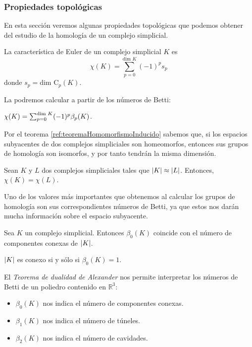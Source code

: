 \subsubsection*{Propiedades topológicas}
En esta sección veremos algunas propiedades topológicas que podemos obtener del estudio de la homología de un complejo simplicial.

\begin{definition}
La característica de Euler de un complejo simplicial $K$ es 
\[
\chi(K) = \sum_{p=0}^{\text{dim } K} (-1)^p s_p
\]
donde $s_p = \text{dim } \text{C}_p(K)$.
\end{definition}
La podremos calcular a partir de los números de Betti:
\begin{theorem}
$\chi(K) = \sum_{p=0}^{\text{\rm dim } K} (-1)^p \beta_p(K)$.
\end{theorem}

Por el teorema \ref{ref:teoremaHomomorfismoInducido} sabemos que, si los espacios subyacentes de dos complejos simpliciales son homeomorfos, entonces sus grupos de homología son isomorfos, y por tanto tendrán la misma dimensión.
\begin{corollary}
\begin{sloppypar}
Sean $K$ y $L$ dos complejos simpliciales tales que $\lvert K\rvert \approx \lvert L\rvert$. Entonces, ${\chi(K)=\chi(L)}$.
\end{sloppypar}
\end{corollary}

Uno de los valores más importantes que obtenemos al calcular los grupos de homología son sus correspondientes números de Betti, ya que estos nos darán mucha información sobre el espacio subyacente. 
\begin{theorem}
Sea $K$ un complejo simplicial. Entonces $\beta_0(K)$ coincide con el número de componentes conexas de $\lvert K\rvert$.
\end{theorem}

\begin{corollary}
$\lvert K\rvert$ es conexo si y sólo si $\beta_0(K)=1$.
\end{corollary}

El \emph{Teorema de dualidad de Alexander} \cite{libroEH} nos permite interpretar los números de Betti de un poliedro contenido en $\mathbb{R}^3$: 
\begin{itemize}
	\item $\beta_0(K)$ nos indica el número de componentes conexas.
	\item $\beta_1(K)$ nos indica el número de túneles.
	\item $\beta_2(K)$ nos indica el número de cavidades.
\end{itemize}

